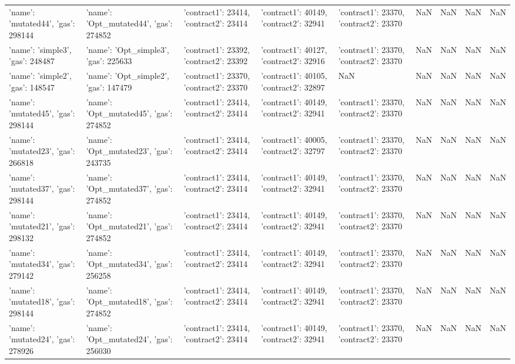 \begin{tabular}{lllllllll}
{'name': 'mutated44', 'gas': 298144} & {'name': 'Opt_mutated44', 'gas': 274852} & {'contract1': 23414, 'contract2': 23414} & {'contract1': 40149, 'contract2': 32941} & {'contract1': 23370, 'contract2': 23370} & NaN & NaN & NaN & NaN \\
{'name': 'simple3', 'gas': 248487} & {'name': 'Opt_simple3', 'gas': 225633} & {'contract1': 23392, 'contract2': 23392} & {'contract1': 40127, 'contract2': 32916} & {'contract1': 23370, 'contract2': 23370} & NaN & NaN & NaN & NaN \\
{'name': 'simple2', 'gas': 148547} & {'name': 'Opt_simple2', 'gas': 147479} & {'contract1': 23370, 'contract2': 23370} & {'contract1': 40105, 'contract2': 32897} & NaN & NaN & NaN & NaN & NaN \\
{'name': 'mutated45', 'gas': 298144} & {'name': 'Opt_mutated45', 'gas': 274852} & {'contract1': 23414, 'contract2': 23414} & {'contract1': 40149, 'contract2': 32941} & {'contract1': 23370, 'contract2': 23370} & NaN & NaN & NaN & NaN \\
{'name': 'mutated23', 'gas': 266818} & {'name': 'Opt_mutated23', 'gas': 243735} & {'contract1': 23414, 'contract2': 23414} & {'contract1': 40005, 'contract2': 32797} & {'contract1': 23370, 'contract2': 23370} & NaN & NaN & NaN & NaN \\
{'name': 'mutated37', 'gas': 298144} & {'name': 'Opt_mutated37', 'gas': 274852} & {'contract1': 23414, 'contract2': 23414} & {'contract1': 40149, 'contract2': 32941} & {'contract1': 23370, 'contract2': 23370} & NaN & NaN & NaN & NaN \\
{'name': 'mutated21', 'gas': 298132} & {'name': 'Opt_mutated21', 'gas': 274852} & {'contract1': 23414, 'contract2': 23414} & {'contract1': 40149, 'contract2': 32941} & {'contract1': 23370, 'contract2': 23370} & NaN & NaN & NaN & NaN \\
{'name': 'mutated34', 'gas': 279142} & {'name': 'Opt_mutated34', 'gas': 256258} & {'contract1': 23414, 'contract2': 23414} & {'contract1': 40149, 'contract2': 32941} & {'contract1': 23370, 'contract2': 23370} & NaN & NaN & NaN & NaN \\
{'name': 'mutated18', 'gas': 298144} & {'name': 'Opt_mutated18', 'gas': 274852} & {'contract1': 23414, 'contract2': 23414} & {'contract1': 40149, 'contract2': 32941} & {'contract1': 23370, 'contract2': 23370} & NaN & NaN & NaN & NaN \\
{'name': 'mutated24', 'gas': 278926} & {'name': 'Opt_mutated24', 'gas': 256030} & {'contract1': 23414, 'contract2': 23414} & {'contract1': 40149, 'contract2': 32941} & {'contract1': 23370, 'contract2': 23370} & NaN & NaN & NaN & NaN \\

\end{tabular}
